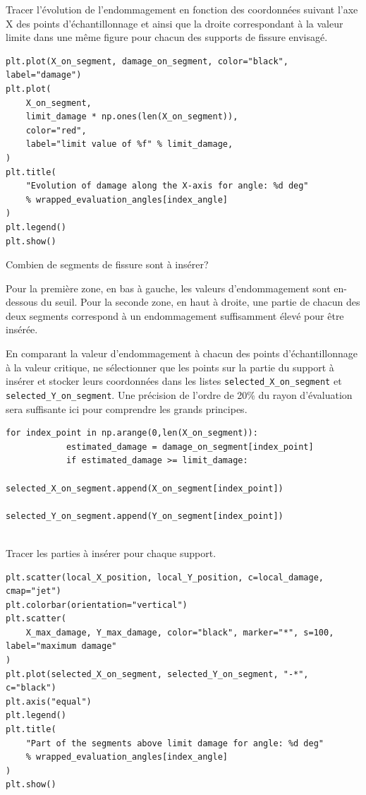 \documentclass[french,12pt]{exam}
\begin{document}
\begin{questions}
\question Tracer l'évolution de l'endommagement en fonction des coordonnées suivant l'axe X des points d'échantillonnage et ainsi que la droite correspondant à la valeur limite dans une même figure pour chacun des supports de fissure envisagé.
\begin{solution}
\begin{lstlisting}
plt.plot(X_on_segment, damage_on_segment, color="black", label="damage")
plt.plot(
    X_on_segment,
    limit_damage * np.ones(len(X_on_segment)),
    color="red",
    label="limit value of %f" % limit_damage,
)
plt.title(
    "Evolution of damage along the X-axis for angle: %d deg"
    % wrapped_evaluation_angles[index_angle]
)
plt.legend()
plt.show()
\end{lstlisting}
\end{solution}
\question Combien de segments de fissure sont à insérer?

\begin{solution}
Pour la première zone, en bas à gauche, les valeurs d'endommagement sont en-dessous du seuil. Pour la seconde zone, en haut à droite, une partie de chacun des deux segments correspond à un endommagement suffisamment élevé pour être insérée.
\end{solution}

\question En comparant la valeur d'endommagement à chacun des points d'échantillonnage à la valeur critique, ne sélectionner que les points sur la partie du support à insérer et stocker leurs coordonnées dans les listes \texttt{selected\_X\_on\_segment} et \texttt{selected\_Y\_on\_segment}. Une précision de l'ordre de 20\% du rayon d'évaluation sera suffisante ici pour comprendre les grands principes.

\begin{solution}
\begin{lstlisting}
for index_point in np.arange(0,len(X_on_segment)):
            estimated_damage = damage_on_segment[index_point]
            if estimated_damage >= limit_damage:
                selected_X_on_segment.append(X_on_segment[index_point])
                selected_Y_on_segment.append(Y_on_segment[index_point])
                
\end{lstlisting}
\end{solution}

\question Tracer les parties à insérer pour chaque support.
\begin{solution}
\begin{lstlisting}
plt.scatter(local_X_position, local_Y_position, c=local_damage, cmap="jet")
plt.colorbar(orientation="vertical")
plt.scatter(
    X_max_damage, Y_max_damage, color="black", marker="*", s=100, label="maximum damage"
)
plt.plot(selected_X_on_segment, selected_Y_on_segment, "-*", c="black")
plt.axis("equal")
plt.legend()
plt.title(
    "Part of the segments above limit damage for angle: %d deg"
    % wrapped_evaluation_angles[index_angle]
)
plt.show()
\end{lstlisting}
\end{solution}


\end{questions}
\end{document}
